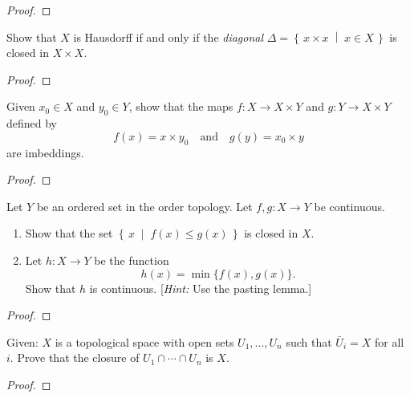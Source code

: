 \begin{proof}
\end{proof}
\newpage
\begin{problem}[Munkres, \S17, p.\,101, 13]
Show that $X$ is Hausdorff if and only if the \emph{diagonal}
$\Delta=\left\{\,x\times x\;\middle|\;x\in X\,\right\}$ is closed
in $X\times X$.
\end{problem}
\begin{proof}
\end{proof}
\newpage
\begin{problem}[Munkres, \S18, p.\,111, 4]
Given $x_0\in X$ and $y_0\in Y$, show that the maps $f\colon X\to
X\times Y$ and $g\colon Y\to X\times Y$ defined by
\[
f(x)=x\times y_0\quad\text{and}\quad g(y)=x_0\times y
\]
are imbeddings.
\end{problem}
\begin{proof}
\end{proof}
\newpage
\begin{problem}[Munkres, \S18, p.\,111-112, 8(a,b)]
Let $Y$ be an ordered set in the order topology. Let
$f,g\colon X\to Y$ be continuous.
\begin{enumerate}[noitemsep,label=(\alph*)]
\item Show that the set
  $\left\{\,x\;\middle|\;f(x)\leq g(x)\,\right\}$ is closed in $X$.
\item Let $h\colon X\to Y$ be the
  function \[h(x)=\min\{f(x),g(x)\}.\] Show that $h$ is
  continuous. [\emph{Hint:} Use the pasting lemma.]
\end{enumerate}
\end{problem}
\begin{proof}
\end{proof}
\newpage
\begin{problem}
Given: $X$ is a topological space with open sets $U_1,...,U_n$
such that $\bar U_i=X$ for all $i$. Prove that the closure of
$U_1\cap\cdots\cap U_n$ is $X$.
\end{problem}
\begin{proof}
\end{proof}

